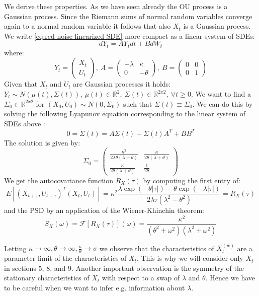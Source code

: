 \documentclass[%
thesis=student,%
coverpage=false,%
titlepage=false,%
headmarks=true, %
english,%
font=libertine, %
math=newpxtx, %
BCOR=5mm,%
coverBCOR=11mm%
]{tumbook}
\begin{document}
We derive these properties. As we have seen already the OU process is a Gaussian process. Since the Riemann sums of normal random variables converge again to a normal random variable it follows that also $X_{t}$ is a Gaussian process. We write \eqref{eq:red noise linearized SDE} more compact as a linear system of SDEs: 
\[
dY_{t} = AY_{t}dt + BdW_{t}
\]
where:
\[
Y_{t} = 
\begin{pmatrix}
   X_{t} \\
   U_{t}
\end{pmatrix}
,\ A = 
\begin{pmatrix}
    -\lambda &  \kappa \\
    0        & -\theta
\end{pmatrix}
,\ B = 
\begin{pmatrix}
    0 & 0 \\
    0 & 1
\end{pmatrix}
\]
Given that $X_{t}$ and $U_{t}$ are Gaussian processes it holds: $Y_{t} \sim N(\mu(t),\Sigma(t)),\ \mu(t) \in \mathbb{R}^{2}, \ \Sigma(t) \in \mathbb{R}^{2x2}, \ \forall t\geq 0$. We want to find a $\Sigma_{0} \in \mathbb{R}^{2x2}$ for $(X_{0},U_{0}) \sim N(0,\Sigma_{0})$ such that $\Sigma(t) \equiv \Sigma_{0}$. We can do this by solving the following Lyapunov equation corresponding to the linear system of SDEs above \cite{gardiner:2009}: 
\[
0 = \dot{\Sigma}(t) = A\Sigma(t) + \Sigma(t) A^{T} + BB^{T} 
\]
The solution is given by: 
\[
\Sigma_{0} = 
\begin{pmatrix}
    \frac{\kappa^{2}}{2\lambda\theta(\lambda + \theta)} & \frac{\kappa}{2\theta(\lambda + \theta)} \\
    \frac{\kappa}{2\theta(\lambda + \theta)} & \frac{1}{2\theta}
\end{pmatrix}
\]
We get the autocovariance function $R_{X}(\tau)$ by computing the first entry of: 
\[
E[(X_{t+\tau},U_{t+\tau})^{T}(X_{t},U_{t})] = \kappa^{2}\frac{\lambda\exp(-\theta\lvert\tau\rvert)-\theta\exp(-\lambda\lvert\tau\rvert)}{2\lambda\tau(\lambda^{2}-\theta^{2})} = R_{X}(\tau)
\]
and the PSD by an application of the Wiener-Khinchin theorem:
\[
S_{X}(\omega) = \mathcal{F}[R_{X}(\tau)](\omega) = \frac{\kappa^{2}}{(\theta^{2} + \omega^{2})(\lambda^{2} + \omega^{2})}
\]

Letting $\kappa \rightarrow \infty, \theta \rightarrow \infty, \frac{\kappa}{\theta} \rightarrow \sigma$ we observe that the characteristics of $X_{t}^{(w)}$ are a parameter limit of the characteristics of $X_{t}$. This is why we will consider only $X_{t}$ in sections 5, 8, and 9.
Another important observation is the symmetry of the stationary characteristics of $X_{t}$ with respect to a swap of $\lambda$ and $\theta$. Hence we have to be careful when we want to infer e.g. information about $\lambda$.
\end{document}
